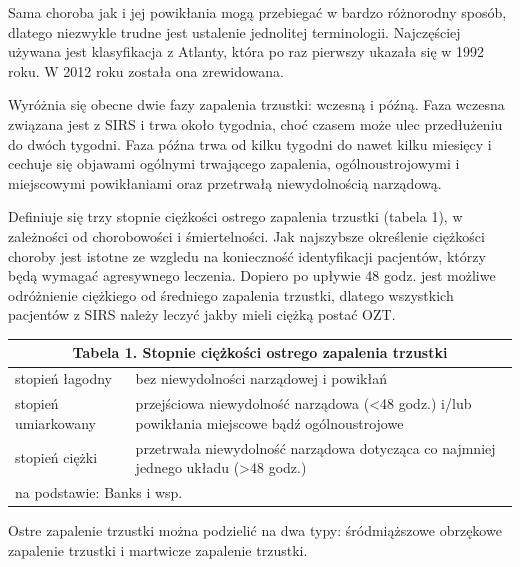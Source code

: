 \documentclass[a4paper, 12pt]{report}
\begin{document}
Sama choroba jak i jej powikłania mogą przebiegać w bardzo różnorodny
sposób, dlatego niezwykle trudne jest ustalenie jednolitej
terminologii. Najczęściej używana jest klasyfikacja z Atlanty, która
po raz pierwszy ukazała się w 1992 roku. W 2012 roku została ona
zrewidowana. 

Wyróżnia się obecne dwie fazy zapalenia trzustki: wczesną
i późną. Faza wczesna związana jest z SIRS i trwa około tygodnia, choć czasem może ulec
przedłużeniu do dwóch tygodni. Faza późna trwa od kilku tygodni do
nawet kilku miesięcy i cechuje się objawami ogólnymi trwającego
zapalenia, ogólnoustrojowymi i miejscowymi powikłaniami oraz
przetrwałą niewydolnością narządową. 

Definiuje się trzy stopnie ciężkości ostrego zapalenia
trzustki (tabela 1),  w zależności od chorobowości i śmiertelności. Jak
najszybsze określenie ciężkości choroby jest istotne ze wzgledu na
konieczność identyfikacji pacjentów, którzy będą wymagać agresywnego
leczenia. Dopiero po upływie 48 godz. jest możliwe odróżnienie
ciężkiego od średniego zapalenia trzustki, dlatego wszystkich
pacjentów z SIRS należy leczyć jakby mieli ciężką postać OZT.
\begin{table}[htbp]
\begin{center}
\begin{footnotesize}
\begin{tabular}{|p{4cm}|p{9cm}|}
\hline
\multicolumn{2}{|c|}{\cellcolor[gray]{0.9} \textbf{Tabela 1. Stopnie ciężkości ostrego zapalenia trzustki}}\\
\hline \hline
stopień łagodny & bez niewydolności narządowej i powikłań\\ \hline
stopień umiarkowany & przejściowa niewydolność narządowa (<48
                           godz.) i/lub powikłania miejscowe bądź
                           ogólnoustrojowe\\ \hline
stopień ciężki & przetrwała niewydolność narządowa dotycząca
                       co najmniej jednego układu (>48 godz.)\\ \hline
\multicolumn{2}{|l|}{\footnotesize{na podstawie: Banks i wsp.\cite{banks}}}\\
\hline
\end{tabular}
\end{footnotesize}
\end{center}
\end{table}

Ostre zapalenie trzustki można podzielić na dwa typy: śródmiąższowe
obrzękowe zapalenie trzustki i martwicze zapalenie trzustki. 
\end{document}
